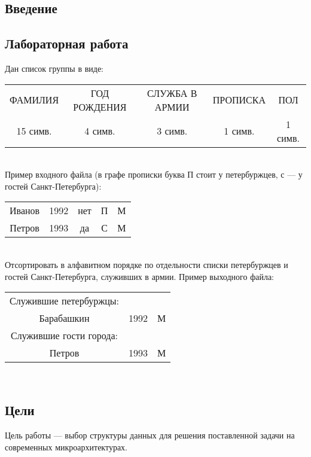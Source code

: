 \documentclass[12pt, a4paper]{report}
\begin{document}
\lstset{style=mystyle}
\thispagestyle{empty}


\tableofcontents
\newpage

\begin{center}
\section*{Введение}
\end{center}
\subsection*{Лабораторная работа}
Дан список группы в виде:\\

\begin{tabular}{ccccc}
ФАМИЛИЯ & ГОД РОЖДЕНИЯ & СЛУЖБА В АРМИИ & ПРОПИСКА & ПОЛ \\
15 симв. & 4 симв. & 3 симв. & 1 симв. & 1 симв.\\
\end{tabular} \\

Пример входного файла (в графе прописки буква П стоит у петербуржцев, с — у гостей
Санкт-Петербурга):\\
\begin{tabular}{ccccc}
Иванов & 1992 & нет & П & М \\
Петров & 1993 & да & С & М\\
\end{tabular} \\

    Отсортировать в алфавитном порядке по отдельности списки петербуржцев и гостей
Санкт-Петербурга, служивших в армии. Пример выходного файла:\\

\begin{tabular}{ccc}
Служившие петербуржцы: \\
Барабашкин & 1992 & М \\
Служившие гости города: \\
Петров & 1993 & М
\end{tabular} \\

\subsection*{Цели}
Цель работы — выбор структуры данных для решения поставленной задачи на современных микроархитектурах. 
\end{document}
